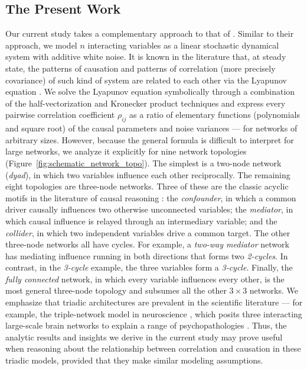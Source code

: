 \documentclass[12pt]{article}
\begin{document}
\subsection*{The Present Work}
Our current study takes a complementary approach to that of \citet{VarandoHansen2020}. Similar to their approach, we model $n$ interacting variables as a linear stochastic dynamical system with additive white noise. It is known in the literature that, at steady state, the patterns of causation and patterns of correlation (more precisely covariance) of such kind of system are related to each other via the Lyapunov equation
\citep{Lyapunov1892, Pavliotis2014, AstromMurray2021}. We solve the Lyapunov equation symbolically through a combination of the half-vectorization and Kronecker product techniques and express every
pairwise correlation coefficient $\rho_{ij}$ as a ratio of elementary functions (polynomials and square root) of the causal parameters and
noise variances --- for networks of arbitrary sizes. However, because the general formula is difficult to interpret
for large networks, we analyze it explicitly for nine
network topologies (Figure~\ref{fig:schematic_network_topo}).
The simplest is a two-node network (\textit{dyad}), in
which two variables influence each other reciprocally.
The remaining eight topologies are three-node networks. Three of these are the classic acyclic motifs in the literature of causal
reasoning \citep{Pearl2009}: the \textit{confounder}, in
which a common driver causally influences two otherwise unconnected
variables; the \textit{mediator}, in which causal influence is
relayed through an intermediary variable; and the \textit{collider},
in which two independent variables drive a common
target. The other three-node networks all have cycles. For example, a
\textit{two-way mediator} network has mediating influence
running in both directions that forms two \textit{2-cycles}. In contrast, in the \textit{3-cycle} example, the three variables form a \textit{3-cycle}.
Finally, the
\textit{fully connected} network, in which every variable
influences every other, is the most general three-node topology
and subsumes all the other $3\times3$ networks.
We emphasize that triadic architectures are prevalent in the
scientific literature --- for example, the triple-network
model in neuroscience \citep{Menon2011, Menon2023}, which posits three
interacting large-scale brain networks to explain a range of
psychopathologies \citep{Kaiser2015, MenonPalaniyappanSupekar2023, LiEtAl2023}. Thus, the analytic results and insights we derive in the current study may prove useful when reasoning about the relationship between correlation and causation in these triadic models, provided that they make similar modeling assumptions.
\end{document}
